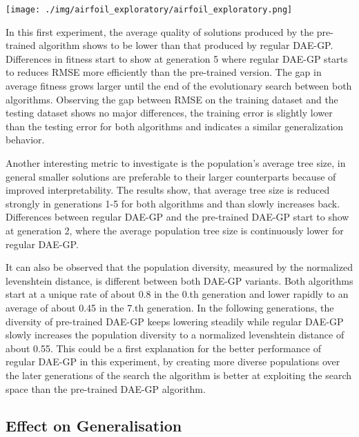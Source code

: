 \documentclass[
  11pt,
]{article}
\let\origfigure\figure
\let\endorigfigure\endfigure
\renewenvironment{figure}[1][2] {
    \expandafter\origfigure\expandafter[H]
} {
    \endorigfigure
}
\begin{document}
\begin{figure}
\centering
\texttt{[image: ./img/airfoil\_exploratory/airfoil\_exploratory.png]}
\caption{Airfoil - First Results}
\end{figure}

In this first experiment, the average quality of solutions produced by
the pre-trained algorithm shows to be lower than that produced by
regular DAE-GP. Differences in fitness start to show at generation 5
where regular DAE-GP starts to reduces RMSE more efficiently than the
pre-trained version. The gap in average fitness grows larger until the
end of the evolutionary search between both algorithms. Observing the
gap between RMSE on the training dataset and the testing dataset shows
no major differences, the training error is slightly lower than the
testing error for both algorithms and indicates a similar generalization
behavior.

Another interesting metric to investigate is the population's average
tree size, in general smaller solutions are preferable to their larger
counterparts because of improved interpretability. The results show,
that average tree size is reduced strongly in generations 1-5 for both
algorithms and than slowly increases back. Differences between regular
DAE-GP and the pre-trained DAE-GP start to show at generation 2, where
the average population tree size is continuously lower for regular
DAE-GP.

It can also be observed that the population diversity, measured by the
normalized levenshtein distance, is different between both DAE-GP
variants. Both algorithms start at a unique rate of about 0.8 in the
0.th generation and lower rapidly to an average of about 0.45 in the
7.th generation. In the following generations, the diversity of
pre-trained DAE-GP keeps lowering steadily while regular DAE-GP slowly
increases the population diversity to a normalized levenshtein distance
of about 0.55. This could be a first explanation for the better
performance of regular DAE-GP in this experiment, by creating more
diverse populations over the later generations of the search the
algorithm is better at exploiting the search space than the pre-trained
DAE-GP algorithm.

\hypertarget{effect-on-generalisation}{%
\subsection{Effect on Generalisation}\label{effect-on-generalisation}}
\end{document}
